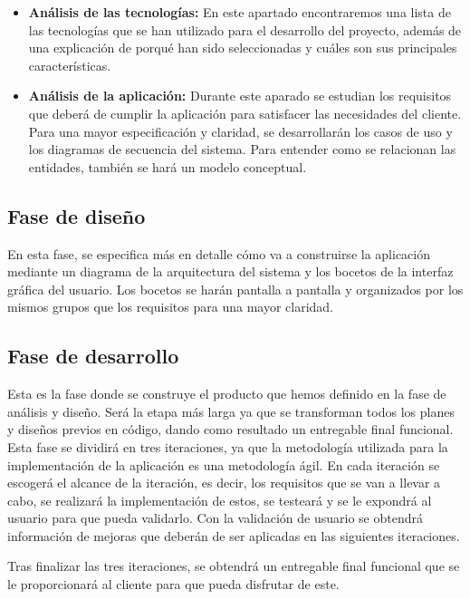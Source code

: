 \begin{itemize}
	\item \textbf{Análisis de las tecnologías:} En este apartado encontraremos una lista de las tecnologías que se han utilizado para el desarrollo del proyecto, además de una explicación de porqué han sido seleccionadas y cuáles son sus principales características.  
	\item \textbf{Análisis de la aplicación:} Durante este aparado se estudian los requisitos que deberá de cumplir la aplicación para satisfacer las necesidades del cliente. Para una mayor especificación y claridad, se desarrollarán los casos de uso y los diagramas de secuencia del sistema. Para entender como se relacionan las entidades, también se hará un modelo conceptual. 
\end{itemize}


\subsection{Fase de diseño}

En esta fase, se especifica más en detalle cómo va a construirse la aplicación mediante un diagrama de la arquitectura del sistema y los bocetos de la interfaz gráfica del usuario. Los bocetos se harán pantalla a pantalla y organizados por los mismos grupos que los requisitos para una mayor claridad. 


\subsection{Fase de desarrollo}

Esta es la fase donde se construye el producto que hemos definido en la fase de análisis y diseño. Será la etapa más larga ya que se transforman todos los planes y diseños previos en código, dando como resultado un entregable final funcional.\\

Esta fase se dividirá en tres iteraciones, ya que la metodología utilizada para la implementación de la aplicación es una metodología ágil. En cada iteración se escogerá el alcance de la iteración, es decir, los requisitos que se van a llevar a cabo, se realizará la implementación de estos, se testeará y se le expondrá al usuario para que pueda validarlo. Con la validación de usuario se obtendrá información de mejoras que deberán de ser aplicadas en las siguientes iteraciones. 

Tras finalizar las tres iteraciones, se obtendrá un entregable final funcional que se le proporcionará al cliente para que pueda disfrutar de este. 


